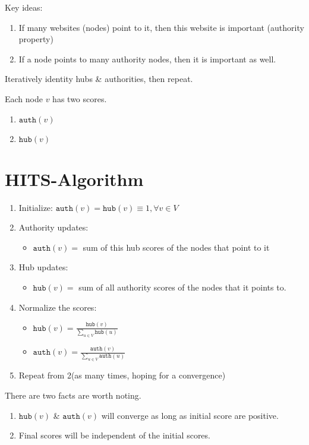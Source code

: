 Key ideas:
\begin{enumerate}
	\item If many websites (nodes) point to it, then this website is important (authority property)
	\item If a node points to many authority nodes, then it is important as well.
\end{enumerate}

Iteratively identity hubs \& authorities, then repeat.

Each node \(v\) has two scores.
\begin{enumerate}
	\item \(\texttt{auth}(v)\)
	\item \(\texttt{hub}(v)\)
\end{enumerate}

\section{HITS-Algorithm}
\begin{enumerate}
	\item Initialize: \(\texttt{auth}(v) = \texttt{hub}(v) \equiv 1, \forall v\in V\)
	\item Authority updates:
	      \begin{itemize}
		      \item \(\texttt{auth}(v) = \) sum of this hub scores of the nodes that point to it
	      \end{itemize}
	\item Hub updates:
	      \begin{itemize}
		      \item \(\texttt{hub}(v) = \) sum of all authority scores of the nodes that it points to.
	      \end{itemize}
	\item Normalize the scores:
	      \begin{itemize}
		      \item \(\texttt{hub}(v) = \frac{\texttt{hub}(v)}{\sum\limits_{u\in V} \texttt{hub}(u) }\)
		      \item \(\texttt{auth}(v) = \frac{\texttt{auth}(v)}{\sum\limits_{u\in V} \texttt{auth}(u) }\)
	      \end{itemize}
	\item Repeat from 2(as many times, hoping for a convergence)
\end{enumerate}

\begin{note}
	There are two facts are worth noting.
	\begin{enumerate}
		\item \(\texttt{hub}(v)\) \& \(\texttt{auth}(v)\) will converge as long as initial score are positive.
		\item Final scores will be independent of the initial scores.
	\end{enumerate}
\end{note}
